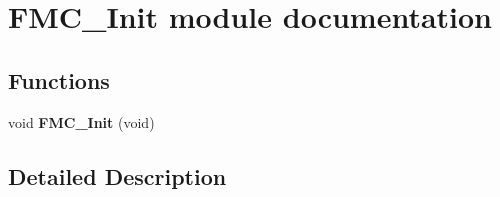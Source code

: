 \hypertarget{group___f_m_c___init__module}{}\section{F\+M\+C\+\_\+\+Init module documentation}
\label{group___f_m_c___init__module}
\subsection*{Functions}
\begin{DoxyCompactItemize}
\item 
void {\bfseries F\+M\+C\+\_\+\+Init} (void)\hypertarget{group___f_m_c___init__module_gaaa320b064396e6f578b71da1516377cd}{}\label{group___f_m_c___init__module_gaaa320b064396e6f578b71da1516377cd}

\end{DoxyCompactItemize}


\subsection{Detailed Description}
